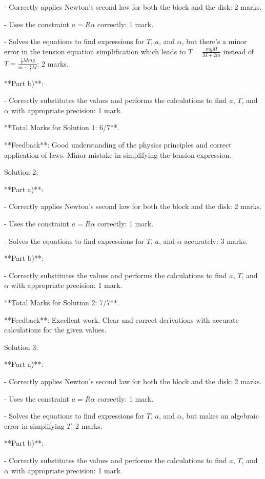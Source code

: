 \documentclass[a4paper,11pt]{article}
\begin{document}
- Correctly applies Newton's second law for both the block and the disk: 2 marks.

- Uses the constraint \( a = R\alpha \) correctly: 1 mark.

- Solves the equations to find expressions for \( T \), \( a \), and \( \alpha \), but there's a minor error in the tension equation simplification which leads to \( T = \frac{mgM}{M + 2m} \) instead of \( T = \frac{\frac{1}{2}Mmg}{m + \frac{1}{2}M} \): 2 marks.
  
**Part b)**:

- Correctly substitutes the values and performs the calculations to find \( a \), \( T \), and \( \alpha \) with appropriate precision: 1 mark.

**Total Marks for Solution 1: 6/7**.

**Feedback**: Good understanding of the physics principles and correct application of laws. Minor mistake in simplifying the tension expression.

Solution 2:

**Part a)**:

- Correctly applies Newton's second law for both the block and the disk: 2 marks.

- Uses the constraint \( a = R\alpha \) correctly: 1 mark.

- Solves the equations to find expressions for \( T \), \( a \), and \( \alpha \) accurately: 3 marks.

**Part b)**:

- Correctly substitutes the values and performs the calculations to find \( a \), \( T \), and \( \alpha \) with appropriate precision: 1 mark.

**Total Marks for Solution 2: 7/7**.

**Feedback**: Excellent work. Clear and correct derivations with accurate calculations for the given values.

Solution 3:

**Part a)**:

- Correctly applies Newton's second law for both the block and the disk: 2 marks.

- Uses the constraint \( a = R\alpha \) correctly: 1 mark.

- Solves the equations to find expressions for \( T \), \( a \), and \( \alpha \), but makes an algebraic error in simplifying \( T \): 2 marks.

**Part b)**:

- Correctly substitutes the values and performs the calculations to find \( a \), \( T \), and \( \alpha \) with appropriate precision: 1 mark.
\end{document}
